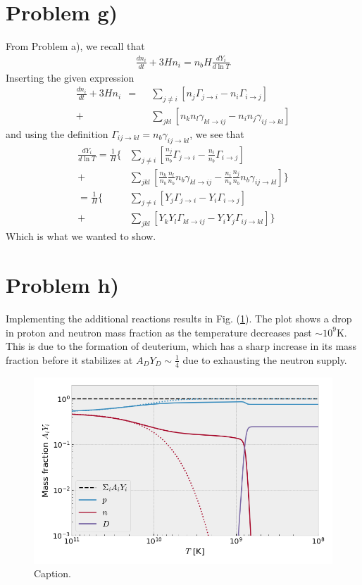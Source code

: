 \documentclass[reprint,english,notitlepage]{revtex4-1}  %
\numberwithin{equation}{section}
\begin{document}
\section{Problem g)}
From Problem a), we recall that
\begin{align}
	\frac{dn_i}{dt} + 3Hn_i = n_b H \frac{dY_i}{d\ln{T}}
\end{align}
Inserting the given expression
\begin{align}
	\frac{dn_i}{dt} + 3Hn_i
	\ \	=\ \ &\sum\limits_{j\neq i} [n_j\Gamma_{j\rightarrow i} - n_i\Gamma_{i\rightarrow j}] \\
		+ &\sum\limits_{jkl} [n_k n_l\gamma_{kl\rightarrow ij} - n_i n_j\gamma_{ij\rightarrow kl}]
\end{align}
and using the definition $\Gamma_{ij\rightarrow kl} = n_b \gamma_{ij\rightarrow kl}$,
we see that
\begin{align}
		  \frac{dY_i}{d\ln{T}}
		= \frac{1}{H}\bigg\{
		  &\sum\limits_{j\neq i} [\frac{n_j}{n_b}\Gamma_{j\rightarrow i} - \frac{n_i}{n_b}\Gamma_{i\rightarrow j}] \\
		+ &\sum\limits_{jkl} [\frac{n_k}{n_b}\frac{n_l}{n_b} n_b\gamma_{kl\rightarrow ij}
													- \frac{n_i}{n_b}\frac{n_j}{n_b} n_b\gamma_{ij\rightarrow kl}]
			\bigg\} \\
		= \frac{1}{H}\bigg\{
		  &\sum\limits_{j\neq i} [Y_j \Gamma_{j\rightarrow i} - Y_i \Gamma_{i\rightarrow j}] \\
		+ &\sum\limits_{jkl} [Y_k Y_l \Gamma_{kl\rightarrow ij}
													- Y_i Y_j \Gamma_{ij\rightarrow kl}]
			\bigg\}
\end{align}
Which is what we wanted to show.
\section{Problem h)}
Implementing the additional reactions results in Fig. (\ref{fig:problem_h}).
The plot shows a drop in proton and neutron mass fraction as the temperature
decreases past $\sim 10^9$K. This is due to the formation of deuterium, which
has a sharp increase in its mass fraction before it stabilizes at
$A_{D} Y_{D} \sim \frac{1}{4}$ due to exhausting the neutron supply.
\begin{figure}[h]
	\includegraphics[width=\columnwidth]{densities_h.png}
	\caption{Caption.}
	\label{fig:problem_h}
\end{figure}
\end{document}
